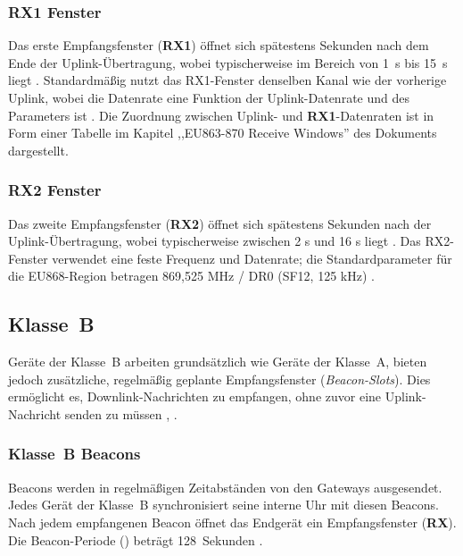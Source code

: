 
\subsubsection{RX1 Fenster}
	Das erste Empfangsfenster (\textbf{RX1}) öffnet sich spätestens  Sekunden nach dem Ende der Uplink-Übertragung, wobei  typischerweise im Bereich von 1~s bis 15~s liegt \cite[12]{LoRaAlliance:2020b}. Standardmä{\ss}ig nutzt das RX1-Fenster denselben Kanal wie der vorherige Uplink, 
	wobei die Datenrate eine Funktion der Uplink-Datenrate und des Parameters  ist \cite[35]{LoRaAlliance:2022}. Die Zuordnung zwischen Uplink- und \textbf{RX1}-Datenraten ist in Form einer Tabelle im Kapitel ,,EU863-870 Receive Windows'' des Dokuments \textcite{LoRaAlliance:2022} dargestellt.
	
\subsubsection{RX2 Fenster}
	Das zweite Empfangsfenster (\textbf{RX2}) öffnet sich spätestens  Sekunden nach der Uplink-Übertragung, wobei  typischerweise zwischen 2 s und 16 s liegt \cite[12]{LoRaAlliance:2020b}. Das RX2-Fenster verwendet eine feste Frequenz und Datenrate; die Standardparameter für die EU868-Region betragen 869{,}525 MHz / DR0 (SF12, 125 kHz) \cite[35]{LoRaAlliance:2022}.


	
\subsection{Klasse~B \label{lorawan:deviceClassB}}
	Geräte der Klasse~B arbeiten grundsätzlich wie Geräte der Klasse~A, bieten jedoch zusätzliche, regelmä{\ss}ig geplante Empfangsfenster (\textit{Beacon-Slots}). Dies ermöglicht es, Downlink-Nachrichten zu empfangen, ohne zuvor eine Uplink-Nachricht senden zu müssen \cite[23 - 24]{Semtech:2024}, \cite[59]{LoRaAlliance:2020b}.

\subsubsection{Klasse~B Beacons}
	Beacons werden in regelmä{\ss}igen Zeitabständen von den Gateways ausgesendet. Jedes Gerät der Klasse~B synchronisiert seine interne Uhr mit diesen Beacons. Nach jedem empfangenen Beacon öffnet das Endgerät ein Empfangsfenster (\textbf{RX}). Die Beacon-Periode () beträgt 128~Sekunden \cite[59]{LoRaAlliance:2020b}.
	

